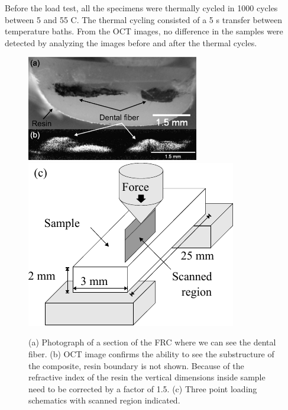 \documentclass[12pt,twoside,english]{book}
\renewcommand{\~}{\perispomeni}%
\numberwithin{equation}{section}
\numberwithin{figure}{section}
\begin{document}
Before the load test, all the specimens were thermally cycled in 1000 cycles between 5 and 55 \textdegree{}C. The thermal cycling consisted of a 5 s transfer between temperature baths. From the OCT images, no difference in the samples were detected by analyzing the images before and after the thermal cycles\cite{Kyotoku:2007p788}.
\begin{figure}[h]
\centering{}\includegraphics[height=4.6cm]{frc-1}
\includegraphics{FRC-setup}
\caption{(a) Photograph of a section of the FRC where we can see the dental fiber. (b) OCT image confirms the ability to see the substructure of the composite, resin boundary is not shown. Because of the refractive index of the resin the vertical dimensions inside sample need to be corrected by a factor of 1.5. (c) Three point loading schematics with scanned region indicated.\label{fig:FRC photo}}
\end{figure}
\end{document}
